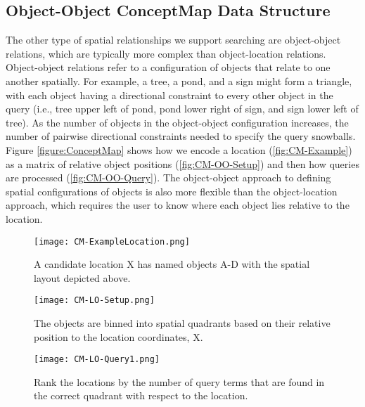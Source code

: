 \subsection{Object-Object ConceptMap Data Structure}
The other type of spatial relationships we support searching are object-object relations, which are typically more complex than object-location relations.
Object-object relations refer to a configuration of objects that relate to one another spatially.
For example, a tree, a pond, and a sign might form a triangle, with each object having a directional constraint to every other object in the query (i.e., tree upper left of pond, pond lower right of sign, and sign lower left of tree).
As the number of objects in the object-object configuration increases, the number of pairwise directional constraints needed to specify the query snowballs. 
Figure \ref{figure:ConceptMap} shows how we encode a location (\ref{fig:CM-Example}) as a matrix of relative object positions (\ref{fig:CM-OO-Setup}) and then how queries are processed (\ref{fig:CM-OO-Query}).
The object-object approach to defining spatial configurations of objects is also more flexible than the object-location approach, which requires the user to know where each object lies relative to the location. 


\begin{figure*}[t]
    \centering
    \begin{subfigure}[t]{.25\textwidth}
        \texttt{[image: CM-ExampleLocation.png]}
        \caption{\small A candidate location X has named objects A-D with the spatial layout depicted above.} 
        \label{fig:CM-LO-Example}
    \end{subfigure}
    \hfill
    \begin{subfigure}[t]{.25\textwidth}
        \texttt{[image: CM-LO-Setup.png]}
        \caption{\small The objects are binned into spatial quadrants based on their relative position to the location coordinates, X.} 
        \label{fig:CM-LO-Setup}
    \end{subfigure}
    \hfill
        \begin{subfigure}[t]{.25\textwidth}
        \texttt{[image: CM-LO-Query1.png]}
        \caption{\small Rank the locations by the number of query terms that are found in the correct quadrant with respect to the location.}
        \label{fig:CM-LO-Query}
    \hfill
    \end{subfigure}
    \caption{\textbf{Object-Location Search Method. A Location-centric data structure (Figure \ref{fig:CM-LO-Setup}) is generated based on the cardinal relations between the objects and the location (Figure \ref{fig:CM-LO-Example}). Then a pictorial query is matched against the structure (Figure \ref{fig:CM-LO-Query}).}}\label{figure:ConceptMap-LO} 
\end{figure*}





